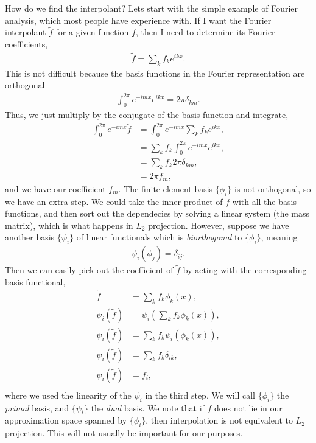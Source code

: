 How do we find the interpolant? Lets start with the simple example of
Fourier analysis, which most people have experience with. If I want
the Fourier interpolant $\tilde f$ for a given function $f$, then I
need to determine its Fourier coefficients,
\begin{align}
  \tilde f = \sum_k f_k e^{i k x}.
\end{align}
This is not difficult because the basis functions in the Fourier
representation are orthogonal
\begin{align}
  \int^{2\pi}_0 e^{-i m x} e^{i k x} = 2\pi \delta_{km}.
\end{align}
Thus, we just multiply by the conjugate of the basis function and integrate,
\begin{align}
  \int^{2\pi}_0 e^{-i m x} \tilde f &= \int^{2\pi}_0 e^{-i m x} \sum_k f_k e^{i k x}, \\
                                  &= \sum_k f_k \int^{2\pi}_0 e^{-i m x} e^{i k x}, \\
                                  &= \sum_k f_k 2\pi \delta_{km}, \\
                                  &= 2\pi f_m,
\end{align}
and we have our coefficient $f_m$. The finite element basis
$\{\phi_i\}$ is not orthogonal, so we have an extra step. We could
take the inner product of $f$ with all the basis functions, and then
sort out the dependecies by solving a linear system (the mass matrix),
which is what happens in $L_2$ projection. However, suppose we have
another basis $\{\psi_i\}$ of linear functionals which is
\textit{biorthogonal} to $\{\phi_i\}$, meaning
\begin{align}
  \psi_i(\phi_j) = \delta_{ij}.
\end{align}
Then we can easily pick out the coefficient of $\tilde f$ by acting
with the corresponding basis functional,
\begin{align}
  \tilde f &= \sum_k f_k \phi_k(x),\\
  \psi_i(\tilde f) &= \psi_i(\sum_k f_k \phi_k(x)),\\
  \psi_i(\tilde f) &= \sum_k f_k \psi_i(\phi_k(x)),\\
  \psi_i(\tilde f) &= \sum_k f_k \delta_{ik},\\
  \psi_i(\tilde f) &= f_i,\\
\end{align}
where we used the linearity of the $\psi_i$ in the third step. We will
call $\{\phi_i\}$ the \textit{primal} basis, and $\{\psi_i\}$ the
\textit{dual} basis. We note that if $f$ does not lie in our
approximation space spanned by $\{\phi_i\}$, then interpolation is not
equivalent to $L_2$ projection. This will not usually be important for
our purposes.

